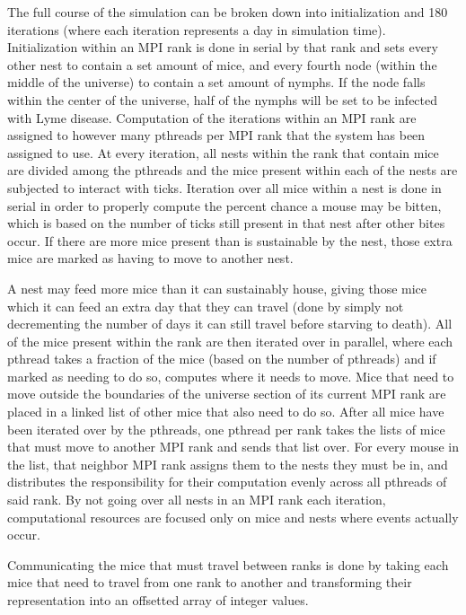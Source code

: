 \documentclass[letterpaper, 10 pt, conference]{ieeeconf}  %
\begin{document}
The full course of the simulation can be broken down into initialization and 180 iterations (where each iteration represents a day in simulation time).  Initialization within an MPI rank is done in serial by that rank and sets every other nest to contain a set amount of mice, and every fourth node (within the middle of the universe) to contain a set amount of nymphs.  If the node falls within the center of the universe, half of the nymphs will be set to be infected with Lyme disease.  Computation of the iterations within an MPI rank are assigned to however many pthreads per MPI rank that the system has been assigned to use.  At every iteration, all nests within the rank that contain mice are divided among the pthreads and the mice present within each of the nests are subjected to interact with ticks.  Iteration over all mice within a nest is done in serial in order to properly compute the percent chance a mouse may be bitten, which is based on the number of ticks still present in that nest after other bites occur.  If there are more mice present than is sustainable by the nest, those extra mice are marked as having to move to another nest.  

A nest may feed more mice than it can sustainably house, giving those mice which it can feed an extra day that they can travel (done by simply not decrementing the number of days it can still travel before starving to death).  All of the mice present within the rank are then iterated over in parallel, where each pthread takes a fraction of the mice (based on the number of pthreads) and if marked as needing to do so, computes where it needs to move.  Mice that need to move outside the boundaries of the universe section of its current MPI rank are placed in a linked list of other mice that also need to do so.  After all mice have been iterated over by the pthreads, one pthread per rank takes the lists of mice that must move to another MPI rank and sends that list over. For every mouse in the list, that neighbor MPI rank assigns them to the nests they must be in, and distributes the responsibility for their computation evenly across all pthreads of said rank.  By not going over all nests in an MPI rank each iteration, computational resources are focused only on mice and nests where events actually occur.  

Communicating the mice that must travel between ranks is done by taking each mice that need to travel from one rank to another and transforming their representation into an offsetted array of integer values.
    
\end{document}

